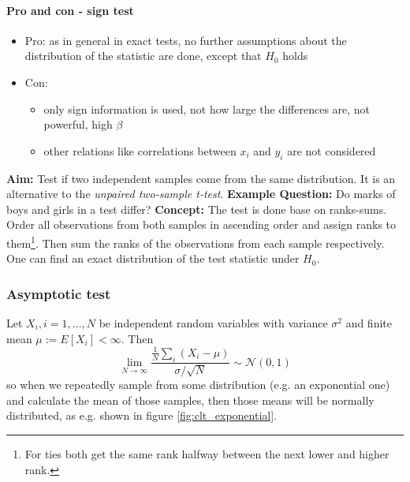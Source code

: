 
\paragraph*{Pro and con - sign test}
\begin{itemize}
    \item \textcolor{green1}{Pro}: as in general in exact tests, no further assumptions about the distribution of the statistic are done, except that $H_0$ holds
    \item \textcolor{red1}{Con}:
    \begin{itemize}
        \item only sign information is used, not how large the differences are, not powerful, high $\beta$
        \item other relations like correlations between $x_i$ and $y_i$ are not considered
    \end{itemize}
\end{itemize}

\textbf{Aim:} Test if two independent samples come from the same distribution. It is an 
alternative to the \textit{unpaired two-sample t-test}.
\textbf{Example Question:} Do marks of boys and girls in a test differ?
\textbf{Concept:} The test is done base on ranks-sums. Order all
observations from both samples in ascending order and assign ranks to them\footnote{For ties both get the same rank halfway between the next lower and higher rank.}. 
Then sum the ranks of the observations from each sample respectively. One can find an exact distribution of the test statistic under $H_0$.

\subsubsection{Asymptotic test}
Let $X_i, i=1,\ldots,N$ be independent random variables with 
variance $\sigma^2$ and finite mean $\mu := E[X_i] < \infty$. Then
\begin{equation}
    \lim _{N \rightarrow \infty} \frac{\frac{1}{N} \sum_i\left(X_i-\mu\right)}{\sigma / \sqrt{N}} \sim \mathcal{N}(0,1)
\end{equation}
so when we repeatedly sample from some distribution (e.g. an exponential one)
and calculate the mean of those samples, then those means will be normally distributed,
as e.g. shown in figure \ref{fig:clt_exponential}.

